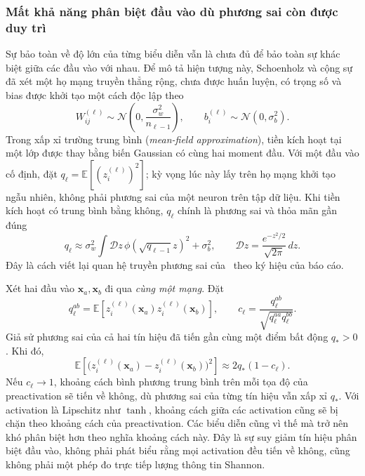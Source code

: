 \documentclass[12pt]{article}
\begin{document}
\subsubsection{Mất khả năng phân biệt đầu vào dù phương sai còn được duy trì}
Sự bảo toàn về độ lớn của từng biểu diễn vẫn là chưa đủ để bảo toàn sự khác biệt giữa các đầu vào với nhau. Để mô tả hiện tượng này, Schoenholz và cộng sự đã xét một họ mạng truyền thẳng rộng, chưa được huấn luyện, có trọng số và bias được khởi tạo một cách độc lập theo
\begin{equation}
 W_{ij}^{(\ell)}\sim\mathcal N\!\left(0,\frac{\sigma_w^2}{n_{\ell-1}}\right),\qquad
 b_i^{(\ell)}\sim\mathcal N(0,\sigma_b^2).
 \label{eq:long-mf-init}
\end{equation}
Trong xấp xỉ trường trung bình (\textit{mean-field approximation}), tiền kích hoạt tại một lớp được thay bằng biến Gaussian có cùng hai moment đầu. Với một đầu vào cố định, đặt $q_\ell=\mathbb E[(z_i^{(\ell)})^2]$; kỳ vọng lúc này lấy trên họ mạng khởi tạo ngẫu nhiên, không phải phương sai của một neuron trên tập dữ liệu. Khi tiền kích hoạt có trung bình bằng không, $q_\ell$ chính là phương sai và thỏa mãn gần đúng
\begin{equation}
 q_\ell\approx\sigma_w^2\int\mathcal Dz\,
 \phi\!\left(\sqrt{q_{\ell-1}}z\right)^2+\sigma_b^2,
 \qquad \mathcal Dz=\frac{e^{-z^2/2}}{\sqrt{2\pi}}\,dz.
 \label{eq:long-mf-q}
\end{equation}
Đây là cách viết lại quan hệ truyền phương sai của~\cite[\S2]{long-schoenholz2017} theo ký hiệu của báo cáo.

Xét hai đầu vào $\mathbf x_a,\mathbf x_b$ đi qua \emph{cùng một mạng}. Đặt
\begin{equation}
 q_\ell^{ab}=\mathbb E\!\left[z_i^{(\ell)}(\mathbf x_a)z_i^{(\ell)}(\mathbf x_b)\right],\qquad
 c_\ell=\frac{q_\ell^{ab}}{\sqrt{q_\ell^{aa}q_\ell^{bb}}}.
 \label{eq:long-corr}
\end{equation}
Giả sử phương sai của cả hai tín hiệu đã tiến gần cùng một điểm bất động $q_*>0$. Khi đó,
\begin{equation}
 \mathbb E\!\left[\big(z_i^{(\ell)}(\mathbf x_a)-z_i^{(\ell)}(\mathbf x_b)\big)^2\right]
 \approx2q_*(1-c_\ell).
 \label{eq:long-distance}
\end{equation}
Nếu $c_\ell\to1$, khoảng cách bình phương trung bình trên mỗi tọa độ của preactivation sẽ tiến về không, dù phương sai của từng tín hiệu vẫn xấp xỉ $q_*$. Với activation là Lipschitz như $\tanh$, khoảng cách giữa các activation cũng sẽ bị chặn theo khoảng cách của preactivation. Các biểu diễn cũng vì thế mà trở nên khó phân biệt hơn theo nghĩa khoảng cách này. Đây là sự suy giảm tín hiệu phân biệt đầu vào, không phải phát biểu rằng mọi activation đều tiến về không, cũng không phải một phép đo trực tiếp lượng thông tin Shannon.
\end{document}
